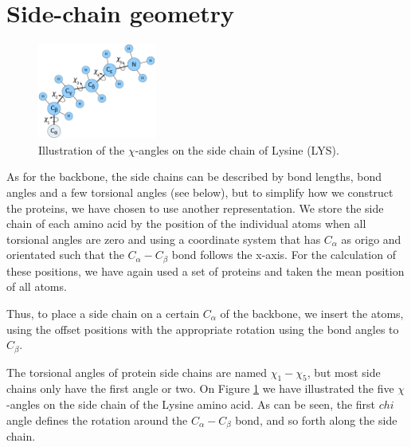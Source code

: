 
\section{Side-chain geometry}
\begin{figure}
	\centering
	\includegraphics[width=0.35\textwidth]{figures/lysine}
    \caption{Illustration of the $\chi$-angles on the side chain of Lysine (LYS).}
    \label{fig:lysine-and-chi}
\end{figure}

As for the backbone, the side chains can be described by bond lengths,
bond angles and a few torsional angles (see below), but to simplify
how we construct the proteins, we have chosen to use another
representation. We store the side chain of each amino acid by the
position of the individual atoms when all torsional angles are zero
and using a coordinate system that has $C_\alpha$ as origo and
orientated such that the $C_\alpha-C_\beta$ bond follows the
x-axis. For the calculation of these positions, we have again used a
set of proteins and taken the mean position of all atoms.

Thus, to place a side chain on a certain $C_\alpha$ of the backbone,
we insert the atoms, using the offset positions with the appropriate
rotation using the bond angles to $C_\beta$.

The torsional angles of protein side chains are named $\chi_1-\chi_5$,
but most side chains only have the first angle or two. On Figure
\ref{fig:lysine-and-chi} we have illustrated the five $\chi$-angles on
the side chain of the Lysine amino acid. As can be seen, the first
$chi$ angle defines the rotation around the $C_\alpha-C_\beta$ bond,
and so forth along the side chain.

